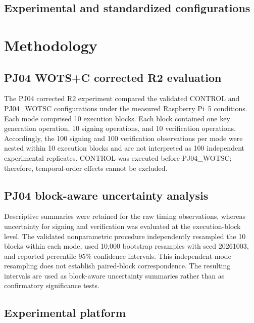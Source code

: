 \documentclass[pdflatex,sn-mathphys-num]{sn-jnl}
\begin{document}
\subsection{Experimental and standardized configurations}

\section{Methodology}

\subsection{PJ04 WOTS+C corrected R2 evaluation}

The PJ04 corrected R2 experiment compared the validated CONTROL and
PJ04\_WOTSC configurations under the measured Raspberry Pi~5 conditions.
Each mode comprised 10 execution blocks. Each block contained one key
generation operation, 10 signing operations, and 10 verification operations.
Accordingly, the 100 signing and 100 verification observations per mode were
nested within 10 execution blocks and are not interpreted as 100 independent
experimental replicates. CONTROL was executed before PJ04\_WOTSC; therefore,
temporal-order effects cannot be excluded.

\subsection{PJ04 block-aware uncertainty analysis}

Descriptive summaries were retained for the raw timing observations, whereas
uncertainty for signing and verification was evaluated at the execution-block
level. The validated nonparametric procedure independently resampled the 10
blocks within each mode, used 10,000 bootstrap resamples with seed 20261003,
and reported percentile 95\% confidence intervals. This independent-mode
resampling does not establish paired-block correspondence. The resulting
intervals are used as block-aware uncertainty summaries rather than as
confirmatory significance tests.

\label{sec:methodology}

\subsection{Experimental platform}
\end{document}
